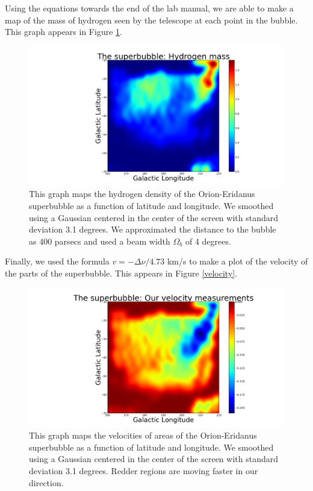 \documentclass[11pt]{article}
\begin{document}
Using the equations towards the end of the lab manual, we are able to make a map of the mass of hydrogen seen by the telescope at each point in the bubble. This graph appears in Figure \ref{hydrogen}.

\begin{figure}
\centering
\includegraphics[scale=0.35]{garphs/hydrogen}
\caption{This graph maps the hydrogen density of the Orion-Eridanus superbubble as a function of latitude and longitude. We smoothed using a Gaussian centered in the center of the screen with standard deviation 3.1 degrees. We approximated the distance to the bubble as 400 parsecs and used a beam width $\Omega_b$ of 4 degrees.\label{hydrogen}}
\end{figure} 

Finally, we used the formula $v = -\Delta\nu / 4.73$ km/s to make a plot of the velocity of the parts of the superbubble. This appears in Figure \ref{velocity}. 

\begin{figure}
\centering
\includegraphics[scale=0.35]{garphs/velocity}
\caption{This graph maps the velocities of areas of the Orion-Eridanus superbubble as a function of latitude and longitude. We smoothed using a Gaussian centered in the center of the screen with standard deviation 3.1 degrees. Redder regions are moving faster in our direction. \label{blackbody}}
\end{figure} 
\end{document}
